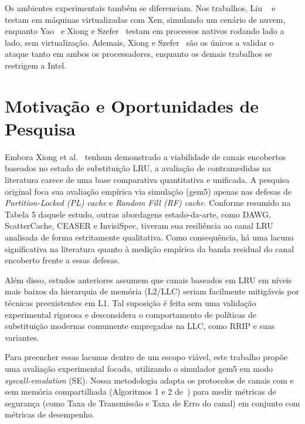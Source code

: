 \documentclass[12pt]{article}
\begin{document}
Os ambientes experimentais também se diferenciam. Nos trabalhos, Liu ~\cite{7163050} e ~\cite{7446082} testam em máquinas virtualizadas com Xen, simulando um cenário de nuvem, enquanto Yao~\cite{8327007} e Xiong e Szefer~\cite{9065598} testam em processos nativos rodando lado a lado, sem virtualização. Ademais, Xiong e Szefer~\cite{9065598} são os únicos a validar o ataque tanto em ambos os processadores, enquanto os demais trabalhos se restrigem a Intel.
\section{Motivação e Oportunidades de Pesquisa}

Embora Xiong et al.~\cite{9354935} tenham demonstrado a viabilidade de canais encobertos baseados no estado de substituição LRU, a avaliação de contramedidas na literatura carece de uma base comparativa quantitativa e unificada. A pesquisa original foca sua avaliação empírica via simulação (gem5) apenas nas defesas de \textit{Partition-Locked (PL) cache} e \textit{Random Fill (RF) cache}. Conforme resumido na Tabela 5 daquele estudo, outras abordagens estado-da-arte, como DAWG, ScatterCache, CEASER e InvisiSpec, tiveram sua resiliência ao canal LRU analisada de forma estritamente qualitativa. Como consequência, há uma lacuna significativa na literatura quanto à medição empírica da banda residual do canal encoberto frente a essas defesas.

Além disso, estudos anteriores assumem que canais baseados em LRU em níveis mais baixos da hierarquia de memória (L2/LLC) seriam facilmente mitigáveis por técnicas preexistentes em L1. Tal suposição é feita sem uma validação experimental rigorosa e desconsidera o comportamento de políticas de substituição modernas comumente empregadas na LLC, como RRIP e suas variantes.

Para preencher essas lacunas dentro de um escopo viável, este trabalho propõe uma avaliação experimental focada, utilizando o simulador gem5 em modo \textit{syscall-emulation} (SE). Nossa metodologia adapta os protocolos de canais com e sem memória compartilhada (Algoritmos 1 e 2 de~\cite{9354935}) para medir métricas de segurança (como Taxa de Transmissão e Taxa de Erro do canal) em conjunto com métricas de desempenho. 
\end{document}
